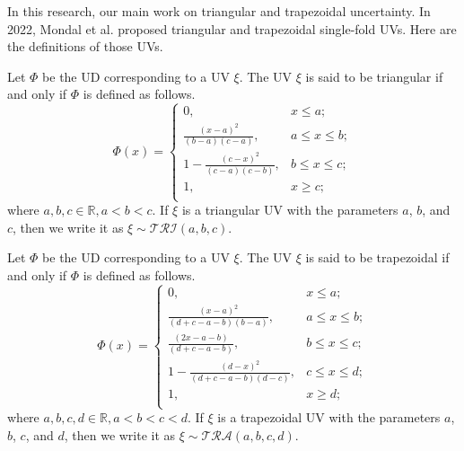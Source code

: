 \par In this research, our main work on triangular and trapezoidal uncertainty. In 2022, Mondal et al. \cite{Mondal 2022} proposed triangular and trapezoidal single-fold UVs. Here are the definitions of those UVs.
\begin{definition}\cite{Mondal 2022}\label{def.5}
	Let $\Phi$ be the UD corresponding to a UV $\xi$. The UV $\xi$ is said to be triangular if and only if $\Phi$ is defined as follows.\\
	\[\Phi(x)=\left\{
	\begin{array}{ll}
		0, & x\leq a;\\
		\frac{(x-a)^2}{(b-a)(c-a)}, & a\leq x\leq b;\\
		1-\frac{(c-x)^2}{(c-a)(c-b)}, & b\leq x\leq c;\\
		1, & x \geq c;\\
	\end{array}
	\right.
	\]
	where $a,b,c \in \mathbb{R}, a<b<c.$
	If $\xi$ is a triangular UV with the parameters $a$, $b$, and $c$, then we write it as $\xi\sim \mathcal{TRI}(a,b,c).$
\end{definition} 
	\begin{definition}\cite{Mondal 2022}\label{def.6}
	Let $\Phi$ be the UD corresponding to a UV $\xi$. The UV $\xi$ is said to be trapezoidal if and only if $\Phi$ is defined as follows.\\
	\[\Phi(x)=\left\{
	\begin{array}{ll}
		0, & x\leq a;\\
		\frac{(x-a)^2}{(d+c-a-b)(b-a)}, & a\leq x\leq b;\\
		\frac{(2x-a-b)}{(d+c-a-b)}, & b\leq x\leq c;\\
		1-\frac{(d-x)^2 }{(d+c-a-b)(d-c)}, & c\leq x\leq d;\\
		1, & x \geq d;\\
	\end{array}
	\right.
	\]
	where $a,b,c,d \in \mathbb{R}, a<b<c<d.$
	If $\xi$ is a trapezoidal UV with the parameters $a$, $b$, $c$, and $d$, then we write it as $\xi\sim \mathcal{TRA}(a,b,c,d).$
\end{definition} 
